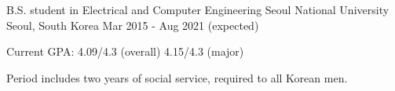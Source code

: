 

\begin{cventries}

  \cventry
    {B.S. student in Electrical and Computer Engineering}
    {Seoul National University} %
    {Seoul, South Korea} %
    {Mar 2015 - Aug 2021 (expected)}
    {
      \begin{cvitems} %
        \item {Current GPA: 4.09/4.3 (overall) 4.15/4.3 (major)}
        \item {Period includes two years of social service, required to all Korean men.}
      \end{cvitems}
    }
    
\end{cventries}
